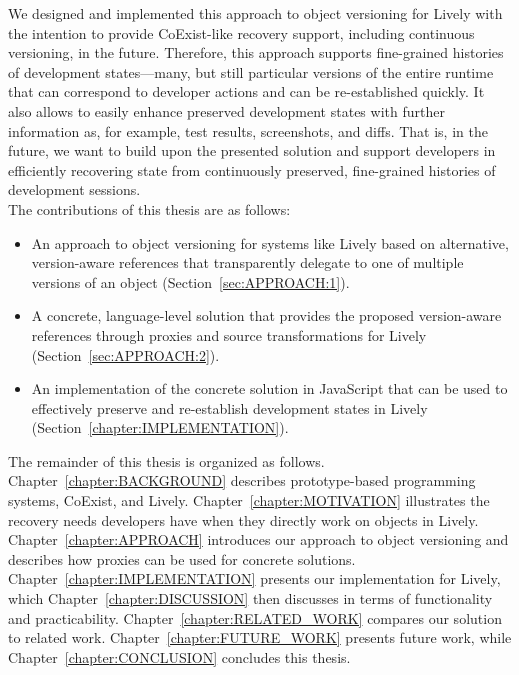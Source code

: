 We designed and implemented this approach to object versioning for Lively with the intention to provide CoExist-like recovery support, including continuous versioning, in the future.
Therefore, this approach supports fine-grained histories of development states---many, but still particular versions of the entire runtime that can correspond to developer actions and can be re-established quickly.
It also allows to easily enhance preserved development states with further information as, for example, test results, screenshots, and diffs.
That is, in the future, we want to build upon the presented solution and support developers in efficiently recovering state from continuously preserved, fine-grained histories of development sessions.\\

The contributions of this thesis are as follows:
\begin{itemize}
    \item An approach to object versioning for systems like Lively based on alternative, version-aware references that transparently delegate to one of multiple versions of an object (Section~\ref{sec:APPROACH:1}).
    \item A concrete, language-level solution that provides the proposed version-aware references through proxies and source transformations for Lively (Section~\ref{sec:APPROACH:2}).
    \item An implementation of the concrete solution in JavaScript that can be used to effectively preserve and re-establish development states in Lively (Section~\ref{chapter:IMPLEMENTATION}).\\
\end{itemize}

The remainder of this thesis is organized as follows. 
Chapter~\ref{chapter:BACKGROUND} describes prototype-based programming systems, CoExist, and Lively.
Chapter~\ref{chapter:MOTIVATION} illustrates the recovery needs developers have when they directly work on objects in Lively.
Chapter~\ref{chapter:APPROACH} introduces our approach to object versioning and describes how proxies can be used for concrete solutions.
Chapter~\ref{chapter:IMPLEMENTATION} presents our implementation for Lively, which Chapter~\ref{chapter:DISCUSSION} then discusses in terms of functionality and practicability.
Chapter~\ref{chapter:RELATED_WORK} compares our solution to related work.
Chapter~\ref{chapter:FUTURE_WORK} presents future work, while Chapter~\ref{chapter:CONCLUSION} concludes this thesis.
